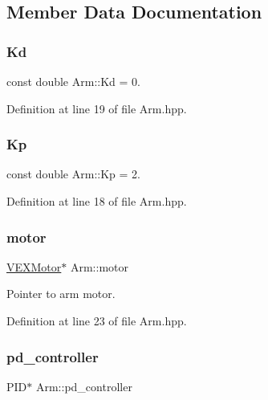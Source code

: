 \subsection{Member Data Documentation}
\mbox{\label{class_arm_a5ba9221bf0f78fea4fb2d231551e3bb9}} 
\subsubsection{\texorpdfstring{Kd}{Kd}}
{\footnotesize\ttfamily const double Arm\+::\+Kd = 0.\hspace{0.3cm}{\ttfamily [private]}}



Definition at line 19 of file Arm.\+hpp.

\mbox{\label{class_arm_ac220c9bad0a0ee0b068f11b1abf7759a}} 
\subsubsection{\texorpdfstring{Kp}{Kp}}
{\footnotesize\ttfamily const double Arm\+::\+Kp = 2.\hspace{0.3cm}{\ttfamily [private]}}



Definition at line 18 of file Arm.\+hpp.

\mbox{\label{class_arm_aa2ef91b2548b256c65dc92166867ba49}} 
\subsubsection{\texorpdfstring{motor}{motor}}
{\footnotesize\ttfamily \hyperlink{class_v_e_x_motor}{V\+E\+X\+Motor}$\ast$ Arm\+::motor\hspace{0.3cm}{\ttfamily [private]}}



Pointer to arm motor. 



Definition at line 23 of file Arm.\+hpp.

\mbox{\label{class_arm_a6a6a8ec7d6f383efd1672c1760a32887}} 
\subsubsection{\texorpdfstring{pd\+\_\+controller}{pd\_controller}}
{\footnotesize\ttfamily P\+ID$\ast$ Arm\+::pd\+\_\+controller\hspace{0.3cm}{\ttfamily [private]}}



